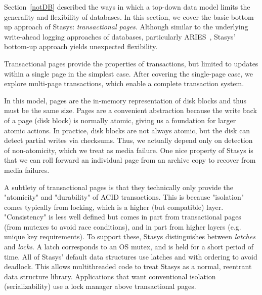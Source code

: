 \documentclass[letterpaper,twocolumn,10pt]{article}
\newcommand{\yad}{Stasys\xspace}
\newcommand{\yads}{Stasys'\xspace}
\begin{document}
Section~\ref{notDB} described the ways in which a top-down data model
limits the generality and flexibility of databases.  In this section,
we cover the basic bottom-up approach of \yad: {\em transactional
pages}. Although similar to the underlying write-ahead logging
approaches of databases, particularly ARIES~\cite{aries}, \yads
bottom-up approach yields unexpected flexibility.

Transactional pages provide the properties of transactions, but
limited to updates within a single page in the simplest case.  After
covering the single-page case, we explore multi-page transactions,
which enable a complete transaction system.

In this model, pages are the in-memory representation of disk blocks
and thus must be the same size.  Pages are a convenient abstraction
because the write back of a page (disk block) is normally atomic,
giving us a foundation for larger atomic actions. In practice, disk
blocks are not always atomic, but the disk can detect partial writes
via checksums.  Thus, we actually depend only on detection of
non-atomicity, which we treat as media failure.  One nice property of
\yad is that we can roll forward an individual page from an archive copy to
recover from media failures.

A subtlety of transactional pages is that they technically only
provide the "atomicity" and "durability" of ACID
transactions.  This is because "isolation" comes typically from locking, which
is a higher (but compatible) layer. "Consistency" is less well defined
but comes in part from transactional pages (from mutexes to avoid race
conditions), and in part from higher layers (e.g. unique key
requirements). To support these, \yad distinguishes between {\em
latches} and {\em locks}.  A latch corresponds to an OS mutex, and is
held for a short period of time.  All of \yads default data structures
use latches and with ordering to avoid deadlock. This allows
multithreaded code to treat \yad as a normal, reentrant data structure
library.  Applications that want conventional isolation
(serializability) use a lock manager above transactional pages.
\end{document}
